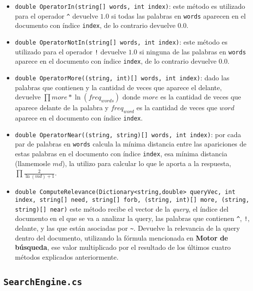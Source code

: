 \documentclass{report}
\begin{document}
\begin{itemize}
	\item {\tt double OperatorIn(string[] words, int index)}: este m\'etodo es utilizado para el operador {\tt \^{}} devuelve $1.0$ si todas las palabras en {\tt words} 
	aparecen en el documento con \'indice {\tt index}, de lo contrario devuelve $0.0$.
	\item {\tt double OperatorNotIn(string[] words, int index)}: este m\'etodo es utilizado para el operador {\tt !} devuelve $1.0$ si ninguna de las palabras en {\tt words} 
	aparece en el documento con \'indice {\tt index}, de lo contrario devuelve $0.0$.
	\item {\tt double OperatorMore((string, int)[] words, int index)}: dado las palabras que contienen {\tt *} y la cantidad de veces que aparece el {\tt *} delante, devuelve $\prod more * \ln(freq_{words})$ donde $more$ es la cantidad de veces que {\tt *} aparece delante de la palabra y $freq_{word}$ es la cantidad de veces que $word$ aparece en el documento con \'indice {\tt index}.
	\item {\tt double OperatorNear((string, string)[] words, int index)}: por cada par de palabras en {\tt words} calcula la m\'inima distancia entre las apariciones de estas palabras en el documento con \'indice {\tt index}, esa m\'inima distancia (llamemosle $md$), la utilizo para calcular lo que le aporta a la respuesta, $\prod \frac{2}{\ln(md) + 1}$.
	\item {\tt double ComputeRelevance(Dictionary<string,double> queryVec, int index, string[] need, string[] forb, (string, int)[] more, (string, string)[] near)} este m\'etodo recibe el vector de la {\it query}, el \'indice del documento en el que se va a analizar la query, las palabras que contienen {\tt \^{}}, {\tt !}, {\tt *} delante, y las que est\'an asociadas por {\tt \~{}}. Devuelve la relevancia de la query dentro del documento, utilizando la f\'ormula mencionada en {\bf Motor de b\'usqueda}, ese valor multiplicado por el resultado de los \'ultimos cuatro m\'etodos explicados anteriormente.
\end{itemize}

\subsection*{\tt SearchEngine.cs}
\end{document}
